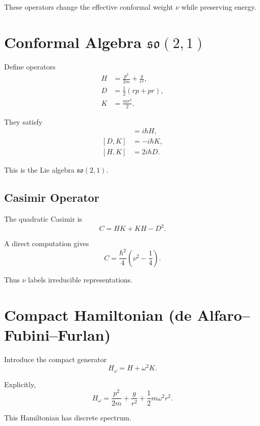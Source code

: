 \documentclass[11pt,a4paper]{article}
\begin{document}
These operators change the effective conformal weight $\nu$
while preserving energy.

\section{Conformal Algebra $\mathfrak{so}(2,1)$}

Define operators
\begin{align}
H &= \frac{p^2}{2m}+\frac{g}{r^2},\\
D &= \frac12(rp+pr),\\
K &= \frac{m r^2}{2}.
\end{align}

They satisfy
\begin{align}
[ D,H ] &= i\hbar H,\\
[ D,K ] &= -i\hbar K,\\
[ H,K ] &= 2i\hbar D.
\end{align}

This is the Lie algebra $\mathfrak{so}(2,1)$.

\subsection*{Casimir Operator}

The quadratic Casimir is
\begin{equation}
C = HK + KH - D^2.
\end{equation}

A direct computation gives
\begin{equation}
C = \frac{\hbar^2}{4}\left(\nu^2-\frac14\right).
\end{equation}

Thus $\nu$ labels irreducible representations.

\section{Compact Hamiltonian (de Alfaro–Fubini–Furlan)}

Introduce the compact generator
\begin{equation}
H_\omega = H+\omega^2 K.
\end{equation}

Explicitly,
\begin{equation}
H_\omega
=
\frac{p^2}{2m}
+
\frac{g}{r^2}
+
\frac12 m\omega^2 r^2.
\end{equation}

This Hamiltonian has discrete spectrum.
\end{document}
